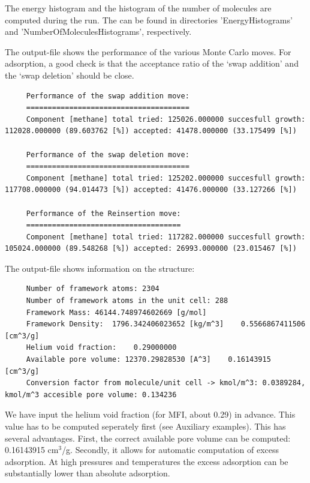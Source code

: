 \noindent
The energy histogram and the histogram of the number of molecules are computed during the run.
The can be found in directories 'EnergyHistograms' and 'NumberOfMoleculesHistograms', respectively.

\noindent
The output-file shows the performance of the various Monte Carlo moves. For adsorption, a good check is that the acceptance ratio
of the `swap addition' and the `swap deletion' should be close.
\begin{tiny}
\begin{verbatim}
     Performance of the swap addition move:
     ======================================
     Component [methane] total tried: 125026.000000 succesfull growth: 112028.000000 (89.603762 [%]) accepted: 41478.000000 (33.175499 [%])
     
     Performance of the swap deletion move:
     ======================================
     Component [methane] total tried: 125202.000000 succesfull growth: 117708.000000 (94.014473 [%]) accepted: 41476.000000 (33.127266 [%])
     
     Performance of the Reinsertion move:
     ====================================
     Component [methane] total tried: 117282.000000 succesfull growth: 105024.000000 (89.548268 [%]) accepted: 26993.000000 (23.015467 [%])
\end{verbatim}
\end{tiny}

The output-file shows information on the structure:
\begin{tiny}
\begin{verbatim}
     Number of framework atoms: 2304
     Number of framework atoms in the unit cell: 288
     Framework Mass: 46144.748974602669 [g/mol]
     Framework Density:  1796.342406023652 [kg/m^3]    0.5566867411506 [cm^3/g]
     Helium void fraction:    0.29000000
     Available pore volume: 12370.29828530 [A^3]    0.16143915 [cm^3/g]
     Conversion factor from molecule/unit cell -> kmol/m^3: 0.0389284, kmol/m^3 accesible pore volume: 0.134236
\end{verbatim}
\end{tiny}
We have input the helium void fraction (for MFI, about 0.29) in advance. 
This value has to be computed seperately first (see Auxiliary examples).
This has several advantages. First, the correct available
pore volume can be computed: 0.16143915 cm$^3$/g. Secondly, it allows for automatic computation of excess adsorption.
At high pressures and temperatures the excess adsorption can be substantially lower than absolute adsorption.

